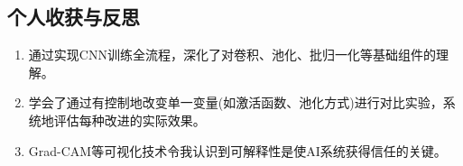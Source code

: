\documentclass[12pt,a4paper]{ctexart}
\begin{document}
\subsection{个人收获与反思}
\begin{enumerate}
    \item 通过实现CNN训练全流程，深化了对卷积、池化、批归一化等基础组件的理解。
    
    \item 学会了通过有控制地改变单一变量(如激活函数、池化方式)进行对比实验，系统地评估每种改进的实际效果。
    
    \item Grad-CAM等可视化技术令我认识到可解释性是使AI系统获得信任的关键。
\end{enumerate}
\end{document}

